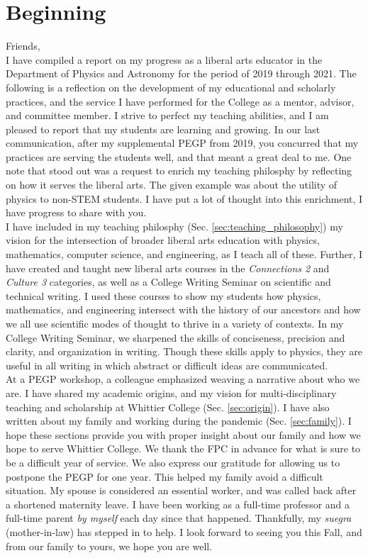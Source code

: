 \documentclass[../../main.tex]{subfiles}
\begin{document}
\section{Beginning}

Friends,
\\
\vspace{0.25cm}
I have compiled a report on my progress as a liberal arts educator in the Department of Physics and Astronomy for the period of 2019 through 2021.  The following is a reflection on the development of my educational and scholarly practices, and the service I have performed for the College as a mentor, advisor, and committee member.  I strive to perfect my teaching abilities, and I am pleased to report that my students are learning and growing.  In our last communication, after my supplemental PEGP from 2019, you concurred that my practices are serving the students well, and that meant a great deal to me.  One note that stood out was a request to enrich my teaching philosphy by reflecting on how it serves the liberal arts.  The given example was about the utility of physics to non-STEM students.  I have put a lot of thought into this enrichment, I have progress to share with you.
\\
\vspace{0.25cm}
I have included in my teaching philosphy (Sec. \ref{sec:teaching_philosophy}) my vision for the intersection of broader liberal arts education with physics, mathematics, computer science, and engineering, as I teach all of these.  Further, I have created and taught new liberal arts courses in the \textit{Connections 2} and \textit{Culture 3} categories, as well as a College Writing Seminar on scientific and technical writing.  I used these courses to show my students how physics, mathematics, and engineering intersect with the history of our ancestors and how we all use scientific modes of thought to thrive in a variety of contexts.  In my College Writing Seminar, we sharpened the skills of conciseness, precision and clarity, and organization in writing.  Though these skills apply to physics, they are useful in all writing in which abstract or difficult ideas are communicated.
\\
\vspace{0.25cm}
At a PEGP workshop, a colleague emphasized weaving a narrative about who we are.  I have shared my academic origins, and my vision for multi-disciplinary teaching and scholarship at Whittier College (Sec. \ref{sec:origin}).  I have also written about my family and working during the pandemic (Sec. \ref{sec:family}).  I hope these sections provide you with proper insight about our family and how we hope to serve Whittier College.  We thank the FPC in advance for what is sure to be a difficult year of service.  We also express our gratitude for allowing us to postpone the PEGP for one year.  This helped my family avoid a difficult situation.  My spouse is considered an essential worker, and was called back after a shortened maternity leave.  I have been working as a full-time professor and a full-time parent \textit{by myself} each day since that happened.  Thankfully, my \textit{suegra} (mother-in-law) has stepped in to help.  I look forward to seeing you this Fall, and from our family to yours, we hope you are well.
\end{document}
